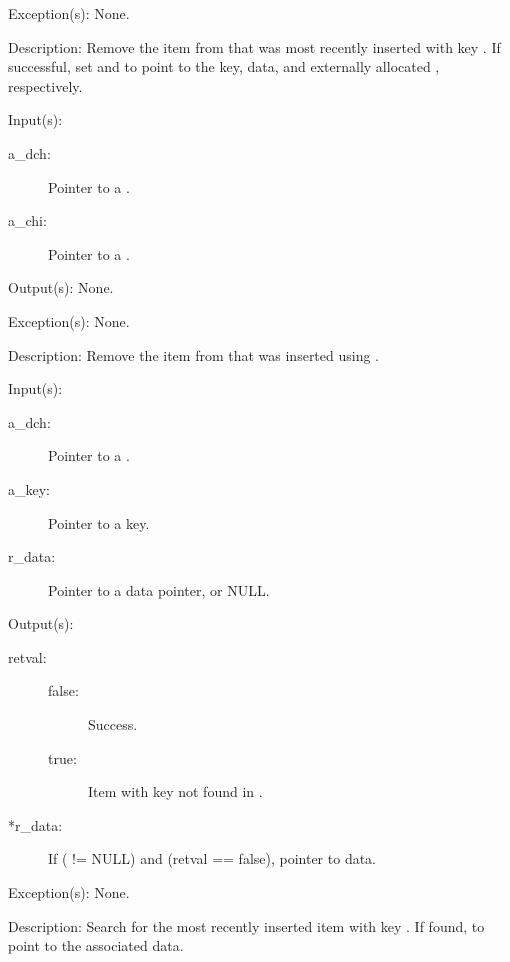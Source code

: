 \begin{capi}
\begin{capilist}
	\item[Exception(s): ] None.
	\item[Description: ]
		Remove the item from  that was most recently
		inserted with key .  If successful, set
		 and  to point to the key, data,
		and externally allocated , respectively.
	\end{capilist}
\label{dch_chi_remove}
	\begin{capilist}
	\item[Input(s): ]
		\begin{description}\item[]
		\item[a\_dch: ]
			Pointer to a .
		\item[a\_chi: ]
			Pointer to a .
		\end{description}
	\item[Output(s): ] None.
	\item[Exception(s): ] None.
	\item[Description: ]
		Remove the item from  that was inserted using
		.
	\end{capilist}
\label{dch_search}
	\begin{capilist}
	\item[Input(s): ]
		\begin{description}\item[]
		\item[a\_dch: ]
			Pointer to a \classname{dch}.
		\item[a\_key: ]
			Pointer to a key.
		\item[r\_data: ]
			Pointer to a data pointer, or NULL.
		\end{description}
	\item[Output(s): ]
		\begin{description}\item[]
		\item[retval: ]
			\begin{description}\item[]
			\item[false: ]
				Success.
			\item[true: ]
				Item with key  not found in
				\cvar{a\_dch}.
			\end{description}
		\item[*r\_data: ]
			If ( != NULL) and (retval == false),
			pointer to data.
		\end{description}
	\item[Exception(s): ] None.
	\item[Description: ]
		Search for the most recently inserted item with key
		.  If found,  to point to the
		associated data.
	\end{capilist}
\end{capi}
